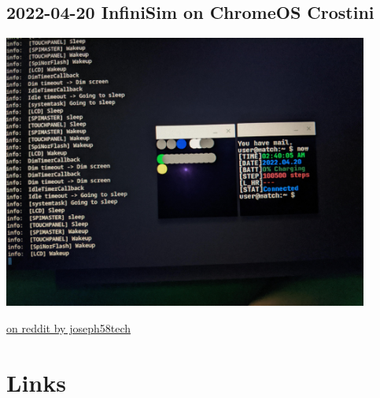 \documentclass{beamer}
\begin{document}
\subsection{2022-04-20 InfiniSim on ChromeOS Crostini}
\begin{frame}{}
  \centering\includegraphics[width=0.9\textwidth]{../2022-04-20_infinisim_on_chrome_os}

  \small \href{https://www.reddit.com/r/pinetime/comments/u7mdt3/the_infinisim_works_on_chrome_os_crostini/}{on reddit by joseph58tech}
\end{frame}

\section{Links}
\end{document}
